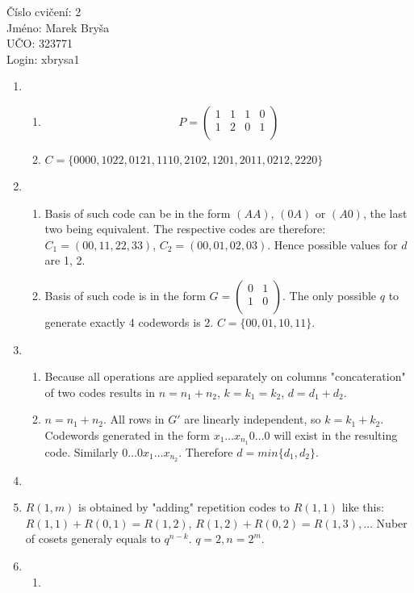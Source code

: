 \documentclass[a4paper,11pt]{article}
\begin{document}
\begin{flushleft}
Číslo cvičení: 2 \\ 
Jméno: Marek Bryša \\
UČO: 323771\\
Login: xbrysa1\\
\end{flushleft}
\begin{enumerate}
  \item
    \begin{enumerate}
      \item
        \[
          P=\begin{pmatrix}
            1 & 1 & 1 & 0 \\
            1 & 2 & 0 & 1 \\
          \end{pmatrix}
        \]
      \item
        $C=\{0000,1022,0121,1110,2102,1201,2011,0212,2220\}$

    \end{enumerate}
  \item
    \begin{enumerate}
      \item
        Basis of such code can be in the form $(AA)$, $(0A)$ or $(A0)$, the last two being equivalent. The respective codes are therefore: $C_1=(00,11,22,33)$, $C_2=(00,01,02,03)$. Hence possible values for $d$ are 1, 2.
      \item
        Basis of such code is in the form $G=\begin{pmatrix}
            0 & 1 \\
            1 & 0 \\
          \end{pmatrix}$. The only possible $q$ to generate exactly 4 codewords is 2. $C=\{00,01,10,11\}$.

    \end{enumerate}
  \item
    \begin{enumerate}
      \item
        Because all operations are applied separately on columns "concateration" of two codes results in $n=n_1+n_2$, $k=k_1=k_2$, $d=d_1+d_2$.
      \item
        $n=n_1+n_2$. All rows in $G'$ are linearly independent, so $k=k_1+k_2$.
        Codewords generated in the form $x_1\dots x_{n_1}0\dots 0$ will exist in the resulting code. 
        Similarly $0\dots 0x_1\dots x_{n_2}$. Therefore $d=min\{d_1, d_2\}$.
    \end{enumerate}
    \item
    \item
      $R(1,m)$ is obtained by "adding" repetition codes to $R(1,1)$ like this: $R(1,1)+R(0,1)=R(1,2)$, $R(1,2)+R(0,2)=R(1,3), \dots$
      Nuber of cosets generaly equals to $q^{n-k}$. $q=2, n=2^m$.
    \item
      \begin{enumerate}
        \item
          
      \end{enumerate}
\end{enumerate}
\end{document}
